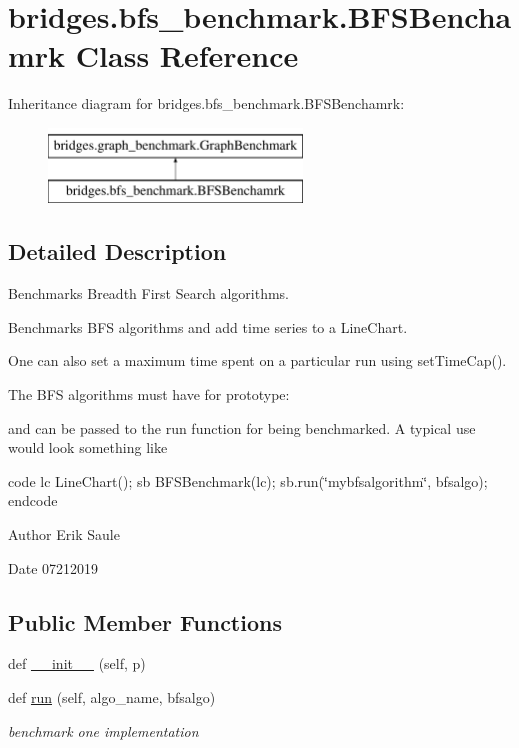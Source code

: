 \hypertarget{classbridges_1_1bfs__benchmark_1_1_b_f_s_benchamrk}{}\section{bridges.\+bfs\+\_\+benchmark.\+B\+F\+S\+Benchamrk Class Reference}
\label{classbridges_1_1bfs__benchmark_1_1_b_f_s_benchamrk}
Inheritance diagram for bridges.\+bfs\+\_\+benchmark.\+B\+F\+S\+Benchamrk\+:\begin{figure}[H]
\begin{center}
\leavevmode
\includegraphics[height=2.000000cm]{classbridges_1_1bfs__benchmark_1_1_b_f_s_benchamrk}
\end{center}
\end{figure}


\subsection{Detailed Description}
Benchmarks Breadth First Search algorithms. 

Benchmarks B\+FS algorithms and add time series to a Line\+Chart.

One can also set a maximum time spent on a particular run using set\+Time\+Cap().

The B\+FS algorithms must have for prototype\+:

and can be passed to the run function for being benchmarked. A typical use would look something like

code lc Line\+Chart(); sb B\+F\+S\+Benchmark(lc); sb.\+run(\char`\"{}mybfsalgorithm\char`\"{}, bfsalgo); endcode

\begin{DoxyAuthor}{Author}
Erik Saule 
\end{DoxyAuthor}
\begin{DoxyDate}{Date}
07212019 
\end{DoxyDate}
\subsection*{Public Member Functions}
\begin{DoxyCompactItemize}
\item 
def \mbox{\hyperlink{classbridges_1_1bfs__benchmark_1_1_b_f_s_benchamrk_ad95e0cd6ce0de759ba17de26eb6365c6}{\+\_\+\+\_\+init\+\_\+\+\_\+}} (self, p)
\item 
def \mbox{\hyperlink{classbridges_1_1bfs__benchmark_1_1_b_f_s_benchamrk_a854cbb0fedcdecf2601ce4a45a393ce7}{run}} (self, algo\+\_\+name, bfsalgo)
\begin{DoxyCompactList}\small\item\em benchmark one implementation \end{DoxyCompactList}\end{DoxyCompactItemize}


